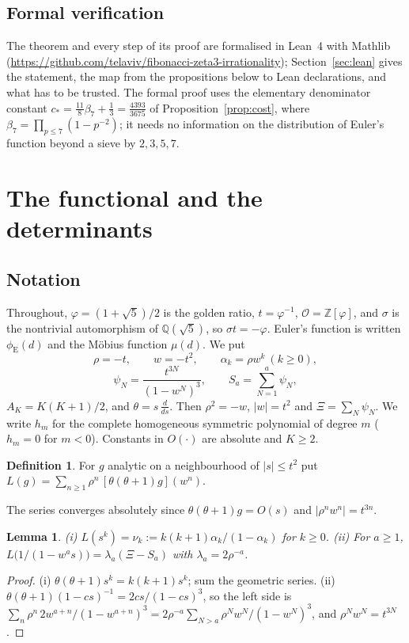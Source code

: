 \documentclass[11pt]{amsart}
\newtheorem{lemma}[theorem]{Lemma}
\theoremstyle{definition}
\newtheorem{definition}[theorem]{Definition}
\theoremstyle{remark}
\numberwithin{equation}{section}
\newcommand{\ZZ}{\mathbb{Z}}
\newcommand{\QQ}{\mathbb{Q}}
\newcommand{\cO}{\mathcal{O}}
\newcommand{\eu}{\phi_{\mathrm E}}
\begin{document}
\subsection*{Formal verification}
The theorem and every step of its proof are formalised in Lean~4 with Mathlib
(\url{https://github.com/telaviv/fibonacci-zeta3-irrationality}); Section~\ref{sec:lean} gives the
statement, the map from the propositions below to Lean declarations, and what has to be trusted. The formal proof uses
the elementary denominator constant $c_*=\frac{11}8\beta_7+\frac13=\frac{4393}{3675}$ of Proposition~\ref{prop:cost},
where $\beta_7=\prod_{p\le7}(1-p^{-2})$; it needs no information on the distribution of Euler's function beyond a
sieve by $2,3,5,7$.

\section{The functional and the determinants}\label{sec:setup}

\subsection*{Notation}
Throughout, $\varphi=(1+\sqrt5)/2$ is the golden ratio, $t=\varphi^{-1}$, $\cO=\ZZ[\varphi]$, and $\sigma$ is the
nontrivial automorphism of $\QQ(\sqrt5)$, so $\sigma t=-\varphi$. Euler's function is written $\eu(d)$ and the
M\"obius function $\mu(d)$. We put
\[
\rho=-t,\qquad w=-t^2,\qquad \alpha_k=\rho w^k\ (k\ge0),
\]
\[
\psi_N=\frac{t^{3N}}{(1-w^N)^3},\qquad S_a=\sum_{N=1}^a\psi_N,
\]
$A_K=K(K+1)/2$, and $\theta=s\,\frac{d}{ds}$. Then $\rho^2=-w$, $|w|=t^2$ and $\Xi=\sum_N\psi_N$. We write $h_m$ for the
complete homogeneous symmetric polynomial of degree $m$ ($h_m=0$ for $m<0$). Constants in $O(\cdot)$ are absolute and
$K\ge2$.

\begin{definition}
For $g$ analytic on a neighbourhood of $|s|\le t^2$ put
$\displaystyle L(g)=\sum_{n\ge1}\rho^n\,[\theta(\theta+1)g](w^n)$.
\end{definition}
The series converges absolutely since $\theta(\theta+1)g=O(s)$ and $|\rho^nw^n|=t^{3n}$.

\begin{lemma}\label{lem:moments}
\textup{(i)} $L(s^k)=\nu_k:=k(k+1)\alpha_k/(1-\alpha_k)$ for $k\ge0$.
\textup{(ii)} For $a\ge1$, $L\bigl(1/(1-w^as)\bigr)=\lambda_a(\Xi-S_a)$ with $\lambda_a=2\rho^{-a}$.
\end{lemma}
\begin{proof}
(i) $\theta(\theta+1)s^k=k(k+1)s^k$; sum the geometric series. (ii) $\theta(\theta+1)(1-cs)^{-1}=2cs/(1-cs)^3$, so the
left side is $\sum_n\rho^n\,2w^{a+n}/(1-w^{a+n})^3=2\rho^{-a}\sum_{N>a}\rho^Nw^N/(1-w^N)^3$, and
$\rho^Nw^N=t^{3N}$.
\end{proof}
\end{document}
